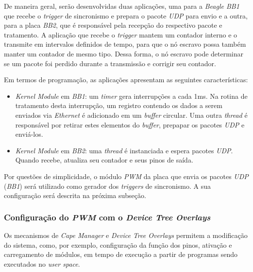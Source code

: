 De maneira geral, serão desenvolvidas duas aplicações, uma para a \textit{Beagle
BB1} que recebe o \textit{trigger} de sincronismo e prepara o pacote
\textit{UDP} para envio e a outra, para a placa \textit{BB2}, que é responsável
pela recepção do respectivo pacote e tratamento. A aplicação que recebe o
\textit{trigger} mantem um contador interno e o transmite em intervalos
definidos de tempo, para que o nó escravo possa também manter um contador
de mesmo tipo. Dessa forma, o nó escravo pode determinar se um pacote foi
perdido durante a transmissão e corrigir seu contador.

\vspace{12pt}

Em termos de programação, as aplicações apresentam as seguintes características:

\begin{itemize} \renewcommand\labelitemi{--}
  \item \textit{Kernel Module} em \textit{BB1}: um \textit{timer} gera
  interrupções a cada 1ms. Na rotina de tratamento desta interrupção, um
  registro contendo os dados a serem enviados via \textit{Ethernet} é
  adicionado em um \textit{buffer} circular. Uma outra \textit{thread}
  é responsável por retirar estes elementos do \textit{buffer}, prepapar os
  pacotes \textit{UDP} e enviá-los.

  \item \textit{Kernel Module} em \textit{BB2}: uma \textit{thread} é
  instanciada e espera pacotes \textit{UDP}. Quando recebe, atualiza seu
  contador e seus pinos de saída.
\end{itemize}

Por questões de simplicidade, o módulo \textit{PWM} da placa que envia os
pacotes \textit{UDP} (\textit{BB1}) será utilizado como gerador dos
\textit{triggers} de sincronismo. A sua configuração será descrita na próxima subseção.

\subsubsection {Configuração do \textit{PWM} com o \textit{Device Tree
Overlays}}

Os mecanismos de \textit{Cape Manager} e \textit{Device Tree Overlays} permitem
a modificação do sistema, como, por exemplo, configuração da função dos pinos,
ativação e carregamento de módulos, em tempo de execução a partir de programas
sendo executados no \textit{user space}.

\vspace{12pt}


